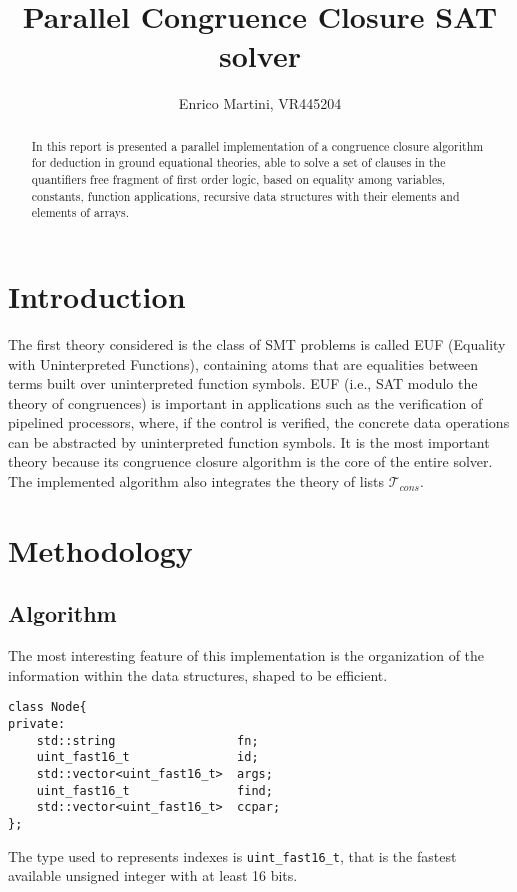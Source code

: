\documentclass{IEEEtran}
\begin{document}
\title{Parallel Congruence Closure SAT solver}
\author{Enrico Martini, VR445204}
\maketitle
\begin{abstract}
 In this report is presented a parallel implementation of a congruence closure algorithm for deduction in ground equational theories, able to solve a set of clauses in the quantifiers free fragment of first order logic, based on equality among variables, constants, function applications, recursive data structures with their elements and elements of arrays.
\end{abstract}
\section{Introduction}
The first theory considered is the class of SMT problems is called EUF (Equality with Uninterpreted Functions), containing atoms that are equalities between terms built over uninterpreted function symbols. EUF (i.e., SAT modulo the theory of congruences) is important in applications such as the verification of pipelined processors, where, if the control is verified, the concrete data operations can be abstracted by uninterpreted function symbols.\cite{NIEUWENHUIS2007557} It is the most important theory because its congruence closure algorithm is the core of the entire solver. The implemented algorithm also integrates the theory of lists $\mathcal{T}_{cons}$. 
\section{Methodology}


\subsection{Algorithm}
The most interesting feature of this implementation is the organization of the information within the data structures, shaped to be efficient.
\begin{lstlisting}[style=cpp]
class Node{
private:
	std::string 				fn;                  
	uint_fast16_t 				id;                
	std::vector<uint_fast16_t> 	args; 
	uint_fast16_t 				find;              
	std::vector<uint_fast16_t> 	ccpar;
};
\end{lstlisting}
The type used to represents indexes is \verb|uint_fast16_t|, that is the fastest available unsigned integer with at least 16 bits.
\end{document}
